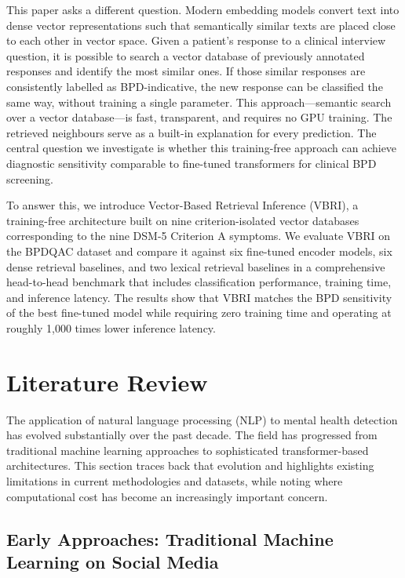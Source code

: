 \documentclass[11pt]{article}
\newcommand{\vbri}{VBRI}
\newcommand{\bpdqac}{BPDQAC}
\newcommand{\dsmv}{DSM-5}
\begin{document}
This paper asks a different question. Modern embedding models convert text into dense vector
representations such that semantically similar texts are placed close to each other in vector
space. Given a patient's response to a clinical interview question, it is possible to search a
vector database of previously annotated responses and identify the most similar ones. If those
similar responses are consistently labelled as BPD-indicative, the new response can be classified
the same way, without training a single parameter. This approach---semantic search over a vector
database---is fast, transparent, and requires no GPU training. The retrieved neighbours serve as
a built-in explanation for every prediction. The central question we investigate is whether this
training-free approach can achieve diagnostic sensitivity comparable to fine-tuned transformers
for clinical BPD screening.

To answer this, we introduce Vector-Based Retrieval Inference (\vbri{}), a training-free
architecture built on nine criterion-isolated vector databases corresponding to the nine \dsmv{}
Criterion A symptoms. We evaluate \vbri{} on the \bpdqac{} dataset and compare it against six
fine-tuned encoder models, six dense retrieval baselines, and two lexical retrieval baselines in
a comprehensive head-to-head benchmark that includes classification performance, training time,
and inference latency. The results show that \vbri{} matches the BPD sensitivity of the best
fine-tuned model while requiring zero training time and operating at roughly 1,000 times lower
inference latency.

\section{Literature Review}\label{sec:lit}

The application of natural language processing (NLP) to mental health detection has evolved
substantially over the past decade. The field has progressed from traditional machine learning
approaches to sophisticated transformer-based architectures. This section traces back that
evolution and highlights existing limitations in current methodologies and datasets, while noting
where computational cost has become an increasingly important concern.

\subsection{Early Approaches: Traditional Machine Learning on Social Media}
\end{document}
